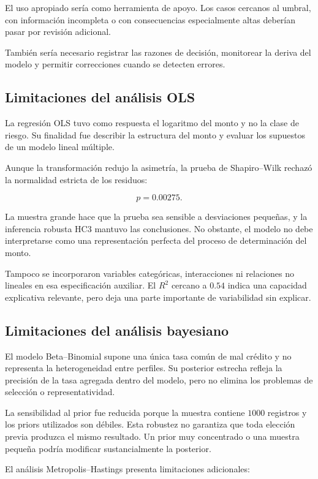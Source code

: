 El uso apropiado sería como herramienta de apoyo. Los casos cercanos al
umbral, con información incompleta o con consecuencias especialmente
altas deberían pasar por revisión adicional.

También sería necesario registrar las razones de decisión, monitorear la
deriva del modelo y permitir correcciones cuando se detecten errores.

\subsection{Limitaciones del análisis OLS}

La regresión OLS tuvo como respuesta el logaritmo del monto y no la clase
de riesgo. Su finalidad fue describir la estructura del monto y evaluar
los supuestos de un modelo lineal múltiple.

Aunque la transformación redujo la asimetría, la prueba de
Shapiro--Wilk rechazó la normalidad estricta de los residuos:

\[
p=0.00275.
\]

La muestra grande hace que la prueba sea sensible a desviaciones pequeñas,
y la inferencia robusta HC3 mantuvo las conclusiones. No obstante, el
modelo no debe interpretarse como una representación perfecta del proceso
de determinación del monto.

Tampoco se incorporaron variables categóricas, interacciones ni relaciones
no lineales en esa especificación auxiliar. El \(R^2\) cercano a
\(0.54\) indica una capacidad explicativa relevante, pero deja una parte
importante de variabilidad sin explicar.

\subsection{Limitaciones del análisis bayesiano}

El modelo Beta--Binomial supone una única tasa común de mal crédito y no
representa la heterogeneidad entre perfiles. Su posterior estrecha refleja
la precisión de la tasa agregada dentro del modelo, pero no elimina los
problemas de selección o representatividad.

La sensibilidad al prior fue reducida porque la muestra contiene
\(1000\) registros y los priors utilizados son débiles. Esta robustez no
garantiza que toda elección previa produzca el mismo resultado. Un prior
muy concentrado o una muestra pequeña podría modificar sustancialmente
la posterior.

El análisis Metropolis--Hastings presenta limitaciones adicionales:


